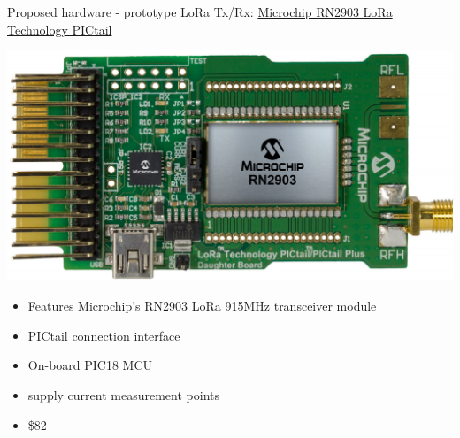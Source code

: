 \documentclass{beamer}
\newcommand{\myhref}[2]{{\color{blue}\href{#1}{#2}}}
\begin{document}
    \begin{frame}{Proposed hardware - prototype}
        LoRa Tx/Rx: \myhref{http://www.microchip.com/DevelopmentTools/ProductDetails.aspx?PartNO=RN-2903-PICTAIL}{Microchip RN2903 LoRa Technology PICtail}
        \vfill
        \begin{center}
            \includegraphics[scale=0.2]{figures/microchip.PNG}
        \end{center}
        \vfill 
        \begin{itemize}
            \item Features Microchip's RN2903 LoRa 915MHz transceiver module
            \item PICtail connection interface
            \item On-board PIC18 MCU
            \item supply current measurement points
            \item \$82
        \end{itemize}
    \end{frame}
    
\end{document}
